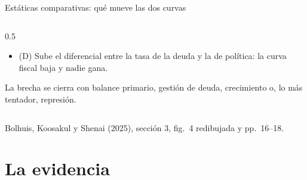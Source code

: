 \documentclass[aspectratio=169,11pt]{beamer}
\newcommand{\fuente}[1]{\par\vfill{\small\color{cGris}#1\par}}
\newcommand{\BKS}{Bolhuis, Koosakul y Shenai (2025)}
\begin{document}
\begin{frame}{Estáticas comparativas: qué mueve las dos curvas}
\begin{columns}[T]
\begin{column}{0.5\textwidth}
\begin{itemize}
        \item (D) Sube el diferencial entre la tasa de la deuda y la de política: la curva fiscal baja y nadie gana.
      \end{itemize}
      La brecha se cierra con balance primario, gestión de deuda, crecimiento o, lo más tentador, represión.
    \end{column}
  \end{columns}
  \fuente{\BKS, sección 3, fig.~4 redibujada y pp.~16--18.}
\end{frame}

\section{La evidencia}
\end{document}
